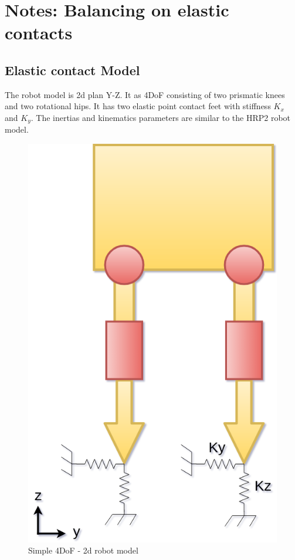 \documentclass[12pt]{article}
\begin{document}
\section*{Notes: Balancing on elastic contacts}


\subsection*{Elastic contact Model}

The robot model is 2d plan Y-Z. It as 4DoF consisting of two prismatic knees and two rotational hips.
It has two elastic point contact feet with stiffness $K_x$ and $K_y$.
The inertias and kinematics parameters are similar to the HRP2 robot model. 
\begin{figure}[!h]
\centering
\includegraphics[scale=0.3]{fig/simple_model.png} 
\caption{Simple 4DoF - 2d robot model}
\label{Tux}
\end{figure}
\end{document}
